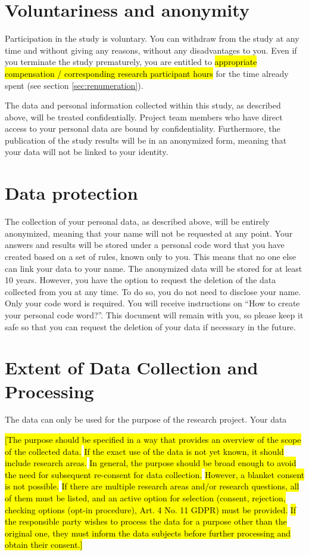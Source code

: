 \documentclass[11pt,twoside,a4paper]{article}
\begin{document}
\section{Voluntariness and anonymity}

Participation in the study is voluntary.
You can withdraw from the study at any time and without giving any reasons, without any disadvantages to you.
Even if you terminate the study prematurely, you are entitled to \hl{appropriate compensation / corresponding research participant hours} for the time already spent (see section \ref{sec:renumeration}).

The data and personal information collected within this study, as described above, will be treated confidentially.
Project team members who have direct access to your personal data are bound by confidentiality.
Furthermore, the publication of the study results will be in an anonymized form, meaning that your data will not be linked to your identity.

\section{Data protection}
\label{sec:data_protection}

The collection of your personal data, as described above, will be entirely anonymized, meaning that your name will not be requested at any point.
Your answers and results will be stored under a personal code word that you have created based on a set of rules, known only to you.
This means that no one else can link your data to your name.
The anonymized data will be stored for at least 10 years.
However, you have the option to request the deletion of the data collected from you at any time.
To do so, you do not need to disclose your name.
Only your code word is required.
You will receive instructions on ``How to create your personal code word?''.
This document will remain with you, so please keep it safe so that you can request the deletion of your data if necessary in the future.

\section{Extent of Data Collection and Processing}

The data can only be used for the purpose of the research project.
Your data

\hl{[The purpose should be specified in a way that provides an overview of the scope of the collected data.}
\hl{If the exact use of the data is not yet known, it should include research areas.}
\hl{In general, the purpose should be broad enough to avoid the need for subsequent re-consent for data collection.}
\hl{However, a blanket consent is not possible.}
\hl{If there are multiple research areas and/or research questions, all of them must be listed, and an active option for selection (consent, rejection, checking options (opt-in procedure), Art. 4 No. 11 GDPR) must be provided.}
\hl{If the responsible party wishes to process the data for a purpose other than the original one, they must inform the data subjects before further processing and obtain their consent.]}
\end{document}

